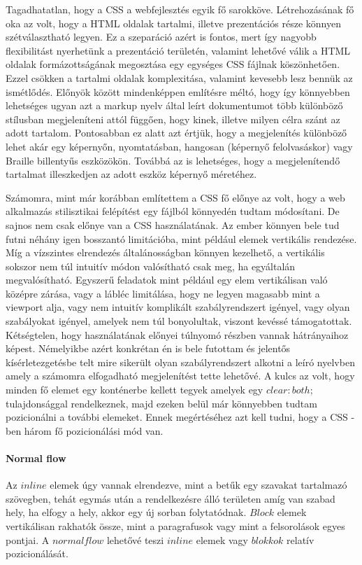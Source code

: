 \documentclass[12pt]{report}
\theoremstyle{definition}
\begin{document}
	Tagadhatatlan, hogy a CSS a webfejlesztés egyik fő sarokköve. Létrehozásának fő oka az volt, hogy a HTML oldalak tartalmi, illetve prezentációs része könnyen szétválasztható legyen. Ez a szeparáció azért is fontos, mert így nagyobb flexibilitást nyerhetünk a prezentáció területén, valamint lehetővé válik a HTML oldalak formázottságának megosztása egy egységes CSS fájlnak köszönhetően. Ezzel csökken a tartalmi oldalak komplexitása, valamint kevesebb lesz bennük az ismétlődés. Előnyök között mindenképpen említésre méltó, hogy így könnyebben lehetséges ugyan azt a markup nyelv által leírt dokumentumot több különböző stílusban megjeleníteni attól függően, hogy kinek, illetve milyen célra szánt az adott tartalom. Pontosabban ez alatt azt értjük, hogy a megjelenítés különböző lehet akár egy képernyőn, nyomtatásban, hangosan (képernyő felolvasáskor) vagy Braille billentyűs eszközökön. Továbbá az is lehetséges, hogy a megjelenítendő tartalmat illeszkedjen az adott eszköz képernyő méretéhez.
	
	Számomra, mint már korábban említettem a CSS fő előnye az volt, hogy a web alkalmazás stilisztikai felépítést egy fájlból könnyedén tudtam módosítani. De sajnos nem csak előnye van a CSS használatának. Az ember könnyen bele tud futni néhány igen bosszantó limitációba, mint például elemek vertikális rendezése. Míg a vízszintes elrendezés általánosságban könnyen kezelhető, a vertikális sokszor nem túl intuitív módon valósítható csak meg, ha egyáltalán megvalósítható. Egyszerű feladatok mint például egy elem vertikálisan való középre zárása, vagy a lábléc limitálása, hogy ne legyen magasabb mint a viewport alja, vagy nem intuitív komplikált szabályrendszert igényel, vagy olyan szabályokat igényel, amelyek nem túl bonyolultak, viszont kevéssé támogatottak. Kétségtelen, hogy használatának előnyei túlnyomó részben vannak hátrányaihoz képest. Némelyikbe azért konkrétan én is bele futottam és jelentős kísérletezgetésbe telt mire sikerült olyan szabályrendszert alkotni a leíró nyelvben amely a számomra elfogadható megjelenítést tette lehetővé. A kulcs az volt, hogy minden fő elemet egy konténerbe kellett tegyek amelyek egy $clear:both;$ tulajdonsággal rendelkeznek, majd ezeken belül már könnyebben tudtam pozicionálni a további elemeket. Ennek megértéséhez azt kell tudni, hogy a CSS -ben három fő pozicionálási mód van. 
	
	\paragraph{Normal flow}Az $inline$ elemek úgy vannak elrendezve, mint a betűk egy szavakat tartalmazó szövegben, tehát egymás után a rendelkezésre álló területen amíg van szabad hely, ha elfogy a hely, akkor egy új sorban folytatódnak. $Block$ elemek vertikálisan rakhatók össze, mint a paragrafusok vagy mint a felsorolások egyes pontjai. A $normal flow$ lehetővé teszi $inline$ elemek vagy $blokkok$ relatív pozicionálását.
	
\end{document}
